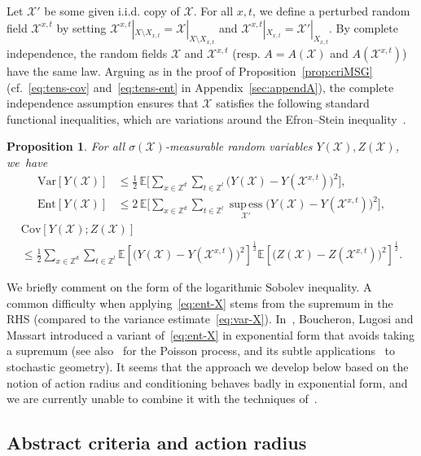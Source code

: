 \documentclass[11pt]{article}
\newtheorem{prop}[theo]{Proposition}
\theoremstyle{definition}
\numberwithin{equation}{section}
\numberwithin{figure}{section}
\numberwithin{table}{section}
\newcommand{\Z}{\mathbb Z}
\newcommand{\expecM}[1]{\mathbb{E}\bigg[#1 \bigg]}
\newcommand{\expec}[1]{\mathbb{E}\left[#1 \right]}
\newcommand{\X}{\mathcal X}
\DeclareMathOperator{\supess}{sup\,ess}
\newcommand{\supessd}[1]{\mathrel{\mathop{\supess}\limits_{#1}}}
\newcommand{\var}[1]{\mathrm{Var}\left[#1\right]}
\newcommand{\ent}[1]{\mathrm{Ent}\!\left[#1\right]}
\newcommand{\cov}[2]{\mathrm{Cov}\left[#1;#2\right]}
\begin{document}

Let $\X'$ be some given i.i.d. copy of $\X$. For all $x,t$, we define a perturbed random field $\X^{x,t}$ by setting $\X^{x,t}|_{X\setminus X_{x,t}}=\X|_{X\setminus X_{x,t}}$ and $\X^{x,t}|_{X_{x,t}}=\X'|_{X_{x,t}}$. By complete independence, the random fields $\X$ and $\X^{x,t}$ (resp. $A=A(\X)$ and $A(\X^{x,t})$) have the same law. Arguing as in the proof of Proposition~\ref{prop:criMSG} (cf.~\eqref{eq:tens-cov} and~\eqref{eq:tens-ent} in Appendix~\ref{sec:appendA}), the complete independence assumption ensures that $\X$ satisfies the following standard functional inequalities, which are variations around the Efron--Stein inequality~\cite{Efron-Stein-81,Steele-86}.

\begin{prop}\label{prop:sgindep}
For all $\sigma(\X)$-measurable random variables $Y(\X),Z(\X)$, we~have
\begin{align}
\var{Y(\X)}&\le\frac12\,\expecM{\sum_{x\in\Z^d}\sum_{t\in\Z^l}\big(Y(\X)-Y(\X^{x,t})\big)^2},\label{eq:var-X}
\\
\ent{Y(\X)}&\le 2\,\expecM{\sum_{x\in\Z^d}\sum_{t\in\Z^l}\supessd{\X'}\big(Y(\X)-Y(\X^{x,t})\big)^2},\label{eq:ent-X}
\end{align}
\begin{multline}\label{eq:cov-X}
\cov{Y(\X)}{Z(\X)}\\
\le \frac12\sum_{x\in\Z^d}\sum_{t\in\Z^l}\expec{ \big(Y(\X)-Y(\X^{x,t})\big)^2}^\frac12\expec{ \big(Z(\X)-Z(\X^{x,t})\big)^2}^\frac12.
\end{multline}
\qedhere
\end{prop}

We briefly comment on the form of the logarithmic Sobolev inequality. A common difficulty when applying~\eqref{eq:ent-X} stems from the supremum in the RHS (compared to the variance estimate~\eqref{eq:var-X}). In~\cite{BLM-03}, Boucheron, Lugosi and Massart introduced a variant of~\eqref{eq:ent-X} in exponential form that avoids taking a supremum (see also~\cite{Wu00} for the Poisson process, and its subtle applications~\cite{BachPec} to stochastic geometry). It seems that the approach we develop below based on the notion of action radius and conditioning behaves badly in exponential form, and we are currently unable to combine it with the techniques of~\cite{BLM-03}.



\subsection{Abstract criteria and action radius}\label{chap:condunif-pasunif}
\end{document}
